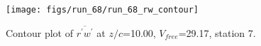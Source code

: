 \begin{figure}[H]
\centering
\texttt{[image: figs/run\_68/run\_68\_rw\_contour]}
\caption{Contour plot of $\overline{r^\prime w^\prime}$ at $z/c$=10.00, $V_{free}$=29.17, station 7.}
\end{figure}


